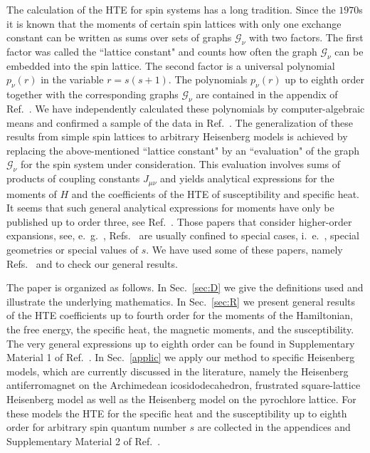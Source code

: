 \documentclass[aps,twocolumn,groupedaddress]{revtex4}
\begin{document}
The calculation of the HTE for spin systems has a long tradition.
Since the $1970$s it is known that the moments of certain spin lattices with
only one exchange constant can be written as sums over sets of graphs
${\mathcal G}_\nu$ with two factors.
The first factor was called the ``lattice constant" and counts how often the
graph ${\mathcal G}_\nu$ can be embedded into the spin lattice.
The second factor is a universal polynomial $p_\nu(r)$ in the variable $r=s(s+1)$.
The polynomials $p_\nu(r)$ up to eighth order together with the corresponding graphs
${\mathcal G}_\nu$ are contained in the appendix of Ref.~.
We have independently calculated these polynomials by computer-algebraic means and
confirmed a sample of the data in Ref.~.
The generalization of these results from simple spin lattices to arbitrary Heisenberg models
is achieved by replacing the above-mentioned ``lattice constant" by an ``evaluation" of the graph
${\mathcal G}_\nu$ for the spin system under consideration. This evaluation involves sums of
products of coupling constants $J_{\mu\nu}$ and yields analytical expressions for the moments
of $H$ and the coefficients of the HTE of susceptibility and specific heat.
It seems that such general analytical expressions for moments have
only be published up to order three, see Ref.~\cite{SSL01}. Those
papers that consider higher-order expansions, see,
e.~g.~, Refs.~\cite{wood1957,pirnie1966,TWB10,CGSM08,FHW04,OZ04a,OZ04b,LKMW03,ST02,HL01,BEU00,ZHO99,ES98a,ES98b,OB96,KBJ96,Jetal00,Rosner_HTE,MBP03}
are usually confined to special cases, i.~e.~, special geometries or special values of $s$.
We have used some of these papers, namely
Refs.~ and 
to check our general results.


The paper is organized as follows. In Sec.~\ref{sec:D} we give the definitions used
and illustrate the underlying mathematics. In Sec.~\ref{sec:R}
we present general results of the HTE coefficients up to fourth order for the
moments of the Hamiltonian, the free energy, the specific heat,  the
magnetic moments, and the susceptibility.
The very general expressions up to eighth order can be
found in Supplementary Material 1\cite{supp1} of Ref.~\cite{SLR11}.
In Sec.~\ref{applic}
we apply our method to specific Heisenberg models, which are currently
discussed in the literature, namely the Heisenberg antiferromagnet on
the Archimedean icosidodecahedron,  frustrated square-lattice
Heisenberg model as well as the Heisenberg model on the pyrochlore
lattice.
For these models the HTE for the specific heat and the susceptibility up to eighth order
for arbitrary spin quantum number $s$ are collected in the appendices
and  Supplementary Material 2\cite{supp2} of Ref.~\cite{SLR11}.
\end{document}

